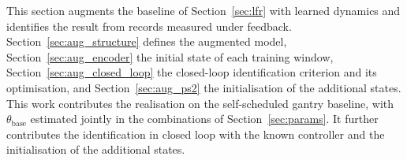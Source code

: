 This section augments the baseline of Section~\ref{sec:lfr} with learned
dynamics and identifies the result from records measured under feedback.
Section~\ref{sec:aug_structure} defines the augmented model,
Section~\ref{sec:aug_encoder} the initial state of each training window,
Section~\ref{sec:aug_closed_loop} the closed-loop identification criterion and
its optimisation, and Section~\ref{sec:aug_ps2} the initialisation of the
additional states.
This work contributes the realisation on the self-scheduled gantry baseline,
with $\theta_{\mathrm{base}}$ estimated jointly in the combinations of
Section~\ref{sec:params}.
It further contributes the identification in closed loop with the known
controller and the initialisation of the additional states.

